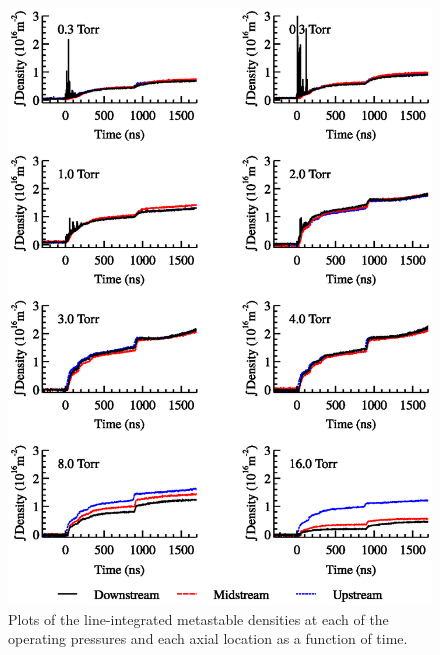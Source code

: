 \begin{figure}
  \centering
  \includegraphics{./chapters/metastables/figures/metastables.eps}
  \caption{Plots of the line-integrated metastable densities at each of
  the operating pressures and each axial location as a function of
  time.}
  \label{fig:metastables}
\end{figure}
